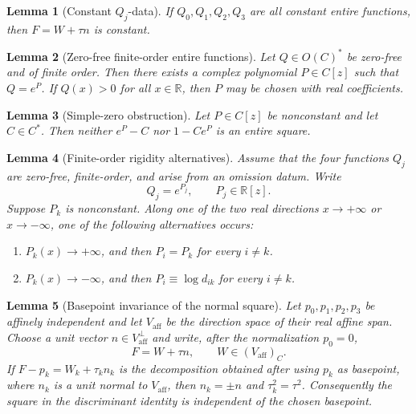 \documentclass[10pt,a4paper]{amsart}
\newtheorem{lemma}{Lemma}
\def\CC{C}%
\def\OO{O}%
\newcommand{\RR}{\mathbb R}
\begin{document}
\begin{lemma}[Constant $Q_j$-data]\label{lem:constant-data}
If $Q_0,Q_1,Q_2,Q_3$ are all constant entire functions, then $F=W+\tau n$ is constant.
\end{lemma}

\begin{lemma}[Zero-free finite-order entire functions]\label{lem:finite-order-zero-free}
Let $Q\in\OO(\CC)^*$ be zero-free and of finite order. Then there exists a complex polynomial $P\in\CC[z]$ such that $Q=e^P$. If $Q(x)>0$ for all $x\in\RR$, then $P$ may be chosen with real coefficients.
\end{lemma}

\begin{lemma}[Simple-zero obstruction]\label{lem:simple-zero}
Let $P\in\CC[z]$ be nonconstant and let $C\in\CC^*$. Then neither $e^P-C$ nor $1-Ce^P$ is an entire square.
\end{lemma}

\begin{lemma}[Finite-order rigidity alternatives]\label{lem:rigidity-alternatives}
Assume that the four functions $Q_j$ are zero-free, finite-order, and arise from an omission datum. Write
\[
Q_j=e^{P_j},\qquad P_j\in\RR[z].
\]
Suppose $P_k$ is nonconstant. Along one of the two real directions $x\to+\infty$ or $x\to-\infty$, one of the following alternatives occurs:
\begin{enumerate}[label=(\Alph*)]
\item $P_k(x)\to+\infty$, and then $P_i=P_k$ for every $i\neq k$.
\item $P_k(x)\to-\infty$, and then $P_i\equiv\log d_{ik}$ for every $i\neq k$.
\end{enumerate}
\end{lemma}

\begin{lemma}[Basepoint invariance of the normal square]\label{lem:basepoint-invariance}
Let $p_0,p_1,p_2,p_3$ be affinely independent and let $V_{\mathrm{aff}}$ be the direction space of their real affine span.  Choose a unit vector $n\in V_{\mathrm{aff}}^\perp$ and write, after the normalization $p_0=0$,
\[
F=W+\tau n,\qquad W\in (V_{\mathrm{aff}})_{\CC}.
\]
If $F-p_k=W_k+\tau_k n_k$ is the decomposition obtained after using $p_k$ as basepoint, where $n_k$ is a unit normal to $V_{\mathrm{aff}}$, then $n_k=\pm n$ and $\tau_k^2=\tau^2$.  Consequently the square in the discriminant identity is independent of the chosen basepoint.
\end{lemma}
\end{document}
